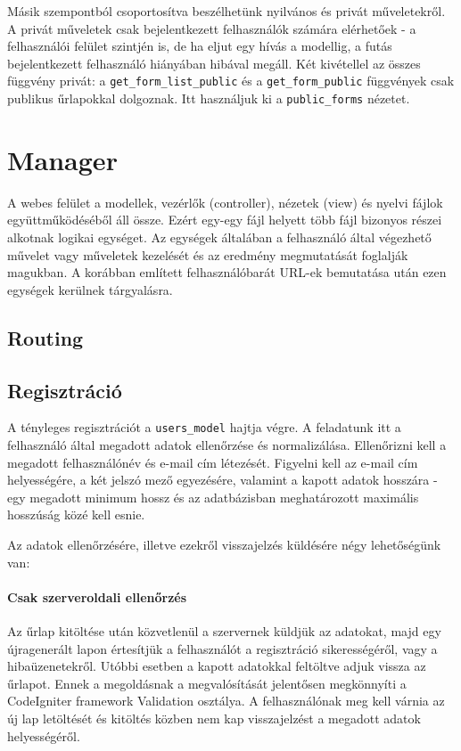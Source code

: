 \documentclass[12pt,a4paper,twoside]{article}
\begin{document}
Másik szempontból csoportosítva beszélhetünk nyilvános és privát műveletekről. A
privát műveletek csak bejelentkezett felhasználók számára elérhetőek - a
felhasználói felület szintjén is, de ha eljut egy hívás a modellig,
a futás bejelentkezett felhasználó hiányában hibával megáll. Két kivétellel az
összes függvény privát: a \texttt{get\_form\_list\_public} és a
\texttt{get\_form\_public} függvények csak publikus űrlapokkal dolgoznak. Itt
használjuk ki a \texttt{public\_forms} nézetet.


\section{Manager}

A webes felület a modellek, vezérlők (controller), nézetek (view) és nyelvi fájlok
együttműködéséből áll össze. Ezért egy-egy fájl helyett több fájl bizonyos
részei alkotnak logikai egységet. Az egységek általában a felhasználó által
végezhető művelet vagy műveletek kezelését és az eredmény megmutatását foglalják
magukban. A korábban említett felhasználóbarát URL-ek bemutatása után ezen
egységek kerülnek tárgyalásra.

\subsection{Routing}


\subsection{Regisztráció}

A tényleges regisztrációt a \texttt{users\_model} hajtja végre. A feladatunk itt
a felhasználó által megadott adatok ellenőrzése és normalizálása. Ellenőrizni
kell a megadott felhasználónév és e-mail cím létezését. Figyelni kell az e-mail
cím helyességére, a két jelszó mező egyezésére, valamint a kapott adatok
hosszára - egy megadott minimum hossz és az adatbázisban meghatározott
maximális hosszúság közé kell esnie.

Az adatok ellenőrzésére, illetve ezekről visszajelzés küldésére négy
lehetőségünk van:

\paragraph{Csak szerveroldali ellenőrzés}
Az űrlap kitöltése után közvetlenül a szervernek küldjük az adatokat, majd egy
újragenerált lapon értesítjük a felhasználót a regisztráció sikerességéről, vagy
a hibaüzenetekről. Utóbbi esetben a kapott adatokkal feltöltve adjuk vissza az
űrlapot. Ennek a megoldásnak a megvalósítását jelentősen megkönnyíti a
CodeIgniter framework Validation osztálya\cite{CI-Val}. A felhasználónak meg kell várnia az új lap
letöltését és kitöltés közben nem kap visszajelzést a megadott adatok
helyességéről.
\end{document}
